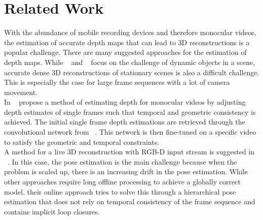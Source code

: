 \chapter{Related Work}
    With the abundance of mobile recording devices and therefore monocular videos, the estimation of accurate depth maps that can lead to 3D reconstructions is a popular challenge.
    There are many suggested approaches for the estimation of depth maps.
    While ~\cite{roussos2012dense} and ~\cite{russell2014video} focus on the challenge of dynamic objects in a scene, accurate dense 3D reconstructions of stationary scenes is also a difficult challenge.
    This is especially the case for large frame sequences with a lot of camera movement.\\
    In ~\cite{luo2020consistent} \citeauthor{luo2020consistent} propose a method of estimating depth for monocular videos by adjusting depth estimates of single frames such that temporal and geometric consistency is achieved.
    The initial single frame depth estimations are retrieved through the convolutional network from ~\cite{mannequin}.
    This network is then fine-tuned on a specific video to satisfy the geometric and temporal constraints.\\
    A method for a live 3D reconstruction with RGB-D input stream is suggested in ~\cite{dai2017bundlefusion}.
    In this case, the pose estimation is the main challenge because when the problem is scaled up, there is an increasing drift in the pose estimation.
    While other approaches require long offline processing to achieve a globally correct model, their online approach tries to solve this through a hierarchical pose estimation that does not rely on temporal consistency of the frame sequence and contains implicit loop closures.